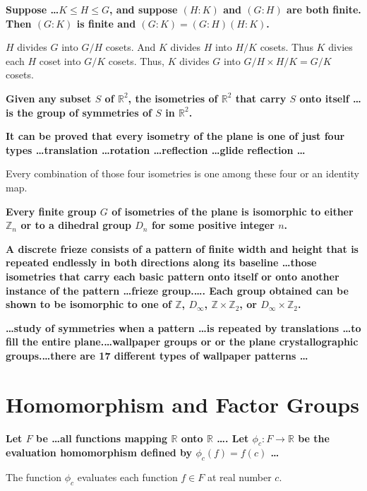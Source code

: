 \documentclass[a4paper,12pt,openany]{book}
\begin{document}
\textbf{\phantom{}}
\textbf{ Suppose \dots $K \le H \le G$, and suppose $(H:K)$ and $(G:H)$ are both finite. Then $(G:K)$ is finite and $(G:K) = (G:H)(H:K)$.}\\
\begin{story}
	$H$ divides $G$ into $G/H$ cosets.
	And $K$ divides $H$ into $H/K$ cosets.
	Thus $K$ divies each $H$ coset into $G/K$ cosets.
	Thus, $K$ divides $G$ into $G/H \times H/K = G/K$ cosets.
\end{story}

\textbf{\phantom{}}
\textbf{Given any subset $S$ of $\mathbb{R}^2$, the isometries of $\mathbb{R}^2$ that carry $S$ onto itself \dots is the group of symmetries of $S$ in $\mathbb{R}^2$.}

\textbf{\phantom{}}
\textbf{It can be proved that every isometry of the plane is one of just four types \dots translation \dots rotation \dots reflection \dots glide reflection \dots }\\
\begin{story}
	Every combination of those four isometries is one among these four or an identity map.
\end{story}


\textbf{\phantom{}}
\textbf{Every finite group $G$ of isometries of the plane is isomorphic to either $\mathbb{Z}_n$ or to a dihedral group $D_n$ for some positive integer $n$.}

\textbf{\phantom{}}
\textbf{A discrete frieze consists of a pattern of finite width and height that is repeated endlessly in both directions along its baseline \dots those isometries that carry each basic pattern onto itself or onto another instance of the pattern \dots frieze group.\dots. Each group obtained can be shown to be isomorphic to one of $\mathbb{Z}$, $D_\infty$, $\mathbb{Z} \times \mathbb{Z}_2$, or $D_\infty \times \mathbb{Z}_2$.}

\textbf{\phantom{}}
\textbf{\dots study of symmetries when a pattern \dots is repeated by translations \dots to fill the entire plane.\dots wallpaper groups or or the plane crystallographic groups.\dots there are 17 different types of wallpaper patterns \dots}

\chapter{Homomorphism and Factor Groups}
\textbf{\phantom{}}
\textbf{Let $F$ be \dots all functions mapping $\mathbb{R}$ onto $\mathbb{R}$ \dots. Let $\phi_c : F \to \mathbb{R}$ be the evaluation homomorphism defined by $\phi_c(f) = f(c)$ \dots}\\
\begin{story}
	The function $\phi_c$ evaluates each function $f \in F$ at real number $c$.
\end{story}
\end{document}
